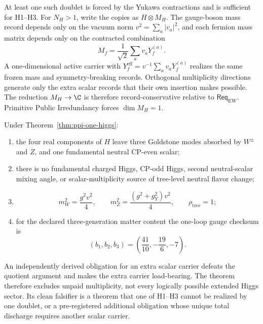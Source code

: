 \begin{proofsketch}
At least one such doublet is forced by the Yukawa contractions and is sufficient for
H1--H3.  For \(N_H>1\), write the copies as \(H\otimes M_H\).  The gauge-boson mass
record depends only on the vacuum norm
\(v^2=\sum_a|v_a|^2\), and each fermion mass matrix depends only on the contracted
combination
\[
 M_f=\frac1{\sqrt2}\sum_a v_aY_f^{(a)}.
\]
A one-dimensional active carrier with
\(Y_f^{\mathrm{eff}}=v^{-1}\sum_av_aY_f^{(a)}\) realizes the same frozen mass and
symmetry-breaking records.  Orthogonal multiplicity directions generate only the
extra scalar records that their own insertion makes possible.  The reduction
\(M_H\to\C\) is therefore record-conservative relative to
\(\mathsf{Req}_{\mathrm{EW}}\).  Primitive Public Irredundancy forces
\(\dim M_H=1\).
\end{proofsketch}

\begin{corollary}
Under Theorem~\ref{thm:ppi-one-higgs}:
\begin{enumerate}[label=\textup{(\roman*)},leftmargin=2.2em]
\item the four real components of \(H\) leave three Goldstone modes absorbed by
      \(W^\pm\) and \(Z\), and one fundamental neutral CP-even scalar;
\item there is no fundamental charged Higgs, CP-odd Higgs, second neutral-scalar
      mixing angle, or scalar-multiplicity source of tree-level neutral flavor
      change;
\item
\[
 m_W^2=\frac{g^2v^2}{4},
 \qquad
 m_Z^2=\frac{(g^2+g_Y^2)v^2}{4},
 \qquad
 \rho_{\mathrm{tree}}=1;
\]
\item for the declared three-generation matter content the one-loop gauge checksum is
\[
 (b_1,b_2,b_3)=\left(\frac{41}{10},-\frac{19}{6},-7\right).
\]
\end{enumerate}
\end{corollary}

\begin{remark}
An independently derived obligation for an extra scalar carrier defeats the quotient
argument and makes the extra carrier load-bearing.  The theorem therefore excludes
unpaid multiplicity, not every logically possible extended Higgs sector.  Its clean
falsifier is a theorem that one of H1--H3 cannot be realized by one doublet, or a
pre-registered additional obligation whose unique total discharge requires another
scalar carrier.
\end{remark}

